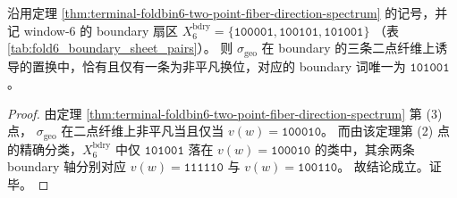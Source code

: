 \begin{corollary}\label{cor:terminal-foldbin6-bdry-unique-geo-selected-axis}
沿用定理 \ref{thm:terminal-foldbin6-two-point-fiber-direction-spectrum} 的记号，并记 window-\(6\) 的 boundary 扇区
\(
X_6^{\mathrm{bdry}}=\{\texttt{100001},\texttt{100101},\texttt{101001}\}
\)
（表 \ref{tab:fold6_boundary_sheet_pairs}）。
则 \(\sigma_{\mathrm{geo}}\) 在 boundary 的三条二点纤维上诱导的置换中，恰有且仅有一条为非平凡换位，对应的 boundary 词唯一为 \(\texttt{101001}\)。
\end{corollary}

\begin{proof}
由定理 \ref{thm:terminal-foldbin6-two-point-fiber-direction-spectrum} 第 (3) 点，
\(\sigma_{\mathrm{geo}}\) 在二点纤维上非平凡当且仅当 \(v(w)=\texttt{100010}\)。
而由该定理第 (2) 点的精确分类，\(X_6^{\mathrm{bdry}}\) 中仅 \(\texttt{101001}\) 落在 \(v(w)=\texttt{100010}\) 的类中，其余两条 boundary 轴分别对应 \(v(w)=\texttt{111110}\) 与 \(v(w)=\texttt{100110}\)。
故结论成立。证毕。
\end{proof}

\endinput
